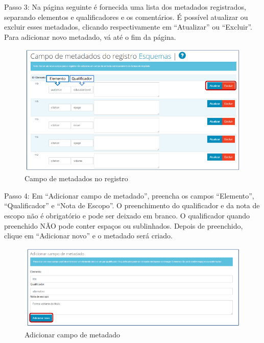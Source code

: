 \documentclass[12pt,hidelinks]{article}
\begin{document}
\newpage

    Passo 3: Na página seguinte é fornecida uma lista dos metadados registrados, separando elementos e qualificadores e os comentários. É possível atualizar ou excluir esses metadados, clicando respectivamente em “Atualizar” ou “Excluir”. Para adicionar novo metadado, vá até o fim da página.
    
    \begin{figure}[!htp]
                \centering
                \includegraphics[scale=0.8]{figura/Figura127.png}
                \caption{Campo de metadados no registro}
            \label{Rotulo}
        \end{figure}
    
    Passo 4: Em “Adicionar campo de metadado”, preencha os campos “Elemento”, “Qualificador” e “Nota de Escopo”. O preenchimento do qualificador e da nota de escopo não é obrigatório e pode ser deixado em branco. O qualificador quando preenchido NÃO pode conter espaços ou sublinhados. Depois de preenchido, clique em “Adicionar novo” e o metadado será criado.
    
    \begin{figure}[!htp]
                \centering
                \includegraphics[scale=0.8]{figura/Figura128.png}
                \caption{Adicionar campo de metadado}
            \label{Rotulo}
        \end{figure}
    
\end{document}

